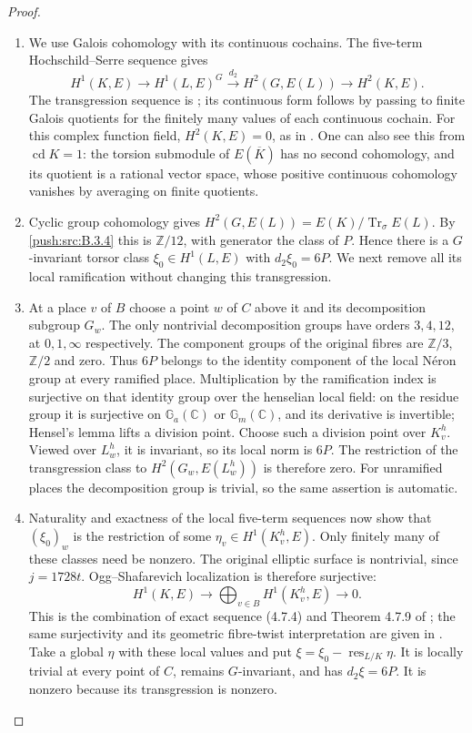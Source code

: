 \begin{proof}
\begin{enumerate}[label=\arabic*.,leftmargin=*]
\item We use Galois cohomology with its
continuous cochains. The five-term
Hochschild--Serre sequence gives
\[
 H^1(K,E)\longrightarrow H^1(L,E)^G
 \xrightarrow{\ d_2\ }H^2(G,E(L))
 \longrightarrow H^2(K,E).
\]
The transgression sequence is
\cite[Chapter III, Section 4, Theorem 2
and the following remark, pp.129--130]{HS53};
its continuous form follows by passing
to finite Galois quotients for the
finitely many values of each continuous
cochain. For this complex function field,
$H^2(K,E)=0$, as in
\cite[Lemma 4.7.8]{CDL24}.
One can also see this from
$\operatorname{cd}K=1$: the torsion
submodule of $E(\overline K)$ has no
second cohomology, and its quotient is
a rational vector space, whose positive
continuous cohomology vanishes by
averaging on finite quotients.

\item Cyclic group cohomology gives
$H^2(G,E(L))=E(K)/\operatorname{Tr}_\sigma E(L)$.
By \ref{push:src:B.3.4} this is $\mathbb Z/12$, with
generator the class of $P$. Hence there
is a $G$-invariant torsor class
$\xi_0\in H^1(L,E)$ with $d_2\xi_0=6P$.
We next remove all its local ramification
without changing this transgression.

\item At a place $v$ of $B$ choose a point
$w$ of $C$ above it and its decomposition
subgroup $G_w$. The only nontrivial
decomposition groups have orders
$3,4,12$, at $0,1,\infty$ respectively.
The component groups of the original
fibres are $\mathbb Z/3$, $\mathbb Z/2$
and zero. Thus $6P$ belongs to the
identity component of the local N\'eron
group at every ramified place.
Multiplication by the ramification
index is surjective on that identity
group over the henselian local field:
on the residue group it is surjective
on $\mathbb G_a(\mathbb C)$ or
$\mathbb G_m(\mathbb C)$, and its
derivative is invertible; Hensel's
lemma lifts a division point.
Choose such a division point over
$K_v^h$. Viewed over $L_w^h$, it is
invariant, so its local norm is $6P$.
The restriction of the transgression
class to $H^2(G_w,E(L_w^h))$ is
therefore zero. For unramified places
the decomposition group is trivial,
so the same assertion is automatic.

\item Naturality and exactness of the local
five-term sequences now show that
$(\xi_0)_w$ is the restriction of some
$\eta_v\in H^1(K_v^h,E)$.
Only finitely many of these classes
need be nonzero. The original elliptic
surface is nontrivial, since
$j=1728t$. Ogg--Shafarevich localization
is therefore surjective:
\[
 H^1(K,E)\longrightarrow
 \bigoplus_{v\in B}H^1(K_v^h,E)
 \longrightarrow0.
\]
This is the combination of exact
sequence (4.7.4) and Theorem 4.7.9
of \cite{CDL24}; the same surjectivity
and its geometric fibre-twist
interpretation are given in
\cite[Section 4, equation (4)]{Xiao91}.
Take a global $\eta$ with these local
values and put
$\xi=\xi_0-\operatorname{res}_{L/K}\eta$.
It is locally trivial at every point
of $C$, remains $G$-invariant, and has
$d_2\xi=6P$. It is nonzero because its
transgression is nonzero.


\end{enumerate}
\end{proof}
